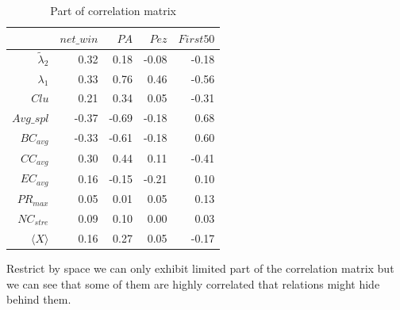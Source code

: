 \documentclass{mcmthesis}
\begin{document}
\begin{table}[ht]
  \caption{Part of correlation matrix}
  \begin{center}
      \begin{tabular}{r|rrrr}
          \toprule
            & $net\_win$&$PA$&$Pez$&$First50$\\
          \midrule
           $\tilde\lambda_2$ & 0.32 & 0.18 & -0.08 & -0.18\\
           $\lambda_1$ & 0.33& 0.76 & 0.46 & -0.56\\
           $Clu$ & 0.21 & 0.34 & 0.05& -0.31 \\
           $Avg\_spl$ & -0.37 & -0.69 & -0.18 & 0.68\\
           $BC_{avg}$ & -0.33 & -0.61 & -0.18 & 0.60\\
           $CC_{avg}$ & 0.30 & 0.44 & 0.11 & -0.41\\
           $EC_{avg}$ & 0.16 & -0.15 & -0.21 & 0.10\\
           $PR_{max}$ & 0.05 & 0.01 & 0.05 & 0.13\\
           $NC_{stre}$ & 0.09 & 0.10 & 0.00 & 0.03\\
           $\langle X\rangle$ & 0.16 & 0.27 & 0.05 & -0.17\\
          \bottomrule
      \end{tabular}
  \end{center}
\end{table}

Restrict by space we can only exhibit limited part of the correlation matrix but we can see that some of them are highly correlated that relations might hide behind them.
\end{document}
